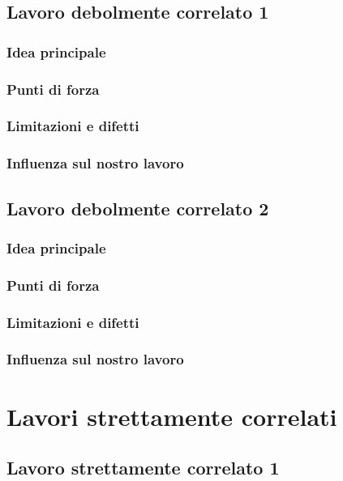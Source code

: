 \subsection{Lavoro debolmente correlato 1}
\subsubsection{Idea principale}
\subsubsection{Punti di forza}
\subsubsection{Limitazioni e difetti}
\subsubsection{Influenza sul nostro lavoro}

\subsection{Lavoro debolmente correlato 2}
\subsubsection{Idea principale}
\subsubsection{Punti di forza}
\subsubsection{Limitazioni e difetti}
\subsubsection{Influenza sul nostro lavoro}

\section{Lavori strettamente correlati}


\subsection{Lavoro strettamente correlato 1}
